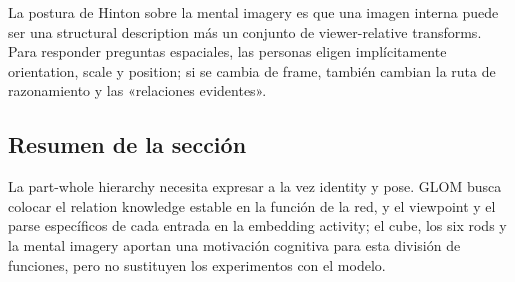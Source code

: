 La postura de Hinton sobre la mental imagery es que una imagen interna puede ser una structural description más un conjunto de viewer-relative transforms. Para responder preguntas espaciales, las personas eligen implícitamente orientation, scale y position; si se cambia de frame, también cambian la ruta de razonamiento y las «relaciones evidentes».



\subsection{Resumen de la sección}

La part-whole hierarchy necesita expresar a la vez identity y pose. GLOM busca colocar el relation knowledge estable en la función de la red, y el viewpoint y el parse específicos de cada entrada en la embedding activity; el cube, los six rods y la mental imagery aportan una motivación cognitiva para esta división de funciones, pero no sustituyen los experimentos con el modelo.
